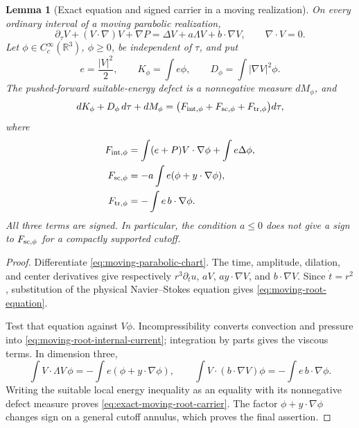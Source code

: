 \documentclass[11pt]{amsart}
\numberwithin{equation}{section}
\theoremstyle{plain}
\newtheorem{lemma}[lemma]{Lemma}
\theoremstyle{definition}
\theoremstyle{remark}
\begin{document}
\begin{lemma}[Exact equation and signed carrier in a moving realization]
\label{lem:exact-moving-root-carrier}
On every ordinary interval of a moving parabolic realization,
\begin{equation}\label{eq:moving-root-equation}
 \partial_\tau V+(V\cdot\nabla)V+\nabla P
 =\Delta V+a\Lambda V+b\cdot\nabla V,
 \qquad \nabla\cdot V=0.
\end{equation}
Let \(\phi\in C_c^\infty(\mathbb R^3)\), \(\phi\ge0\), be independent of
\(\tau\), and put
\[
 e=\frac{|V|^2}{2},\qquad K_\phi=\int e\phi,
 \qquad D_\phi=\int|\nabla V|^2\phi.
\]
The pushed-forward suitable-energy defect is a nonnegative measure
\(dM_\phi\), and
\begin{equation}\label{eq:exact-moving-root-carrier}
 dK_\phi+D_\phi\,d\tau+dM_\phi
 =\bigl(F_{\rm int,\phi}+F_{\rm sc,\phi}
        +F_{\rm tr,\phi}\bigr)d\tau,
\end{equation}
where
\begin{align}
 F_{\rm int,\phi}
  &=\int(e+P)V\cdot\nabla\phi+\int e\Delta\phi,
 \label{eq:moving-root-internal-current}\\
 F_{\rm sc,\phi}
  &=-a\int e(\phi+y\cdot\nabla\phi),
 \label{eq:moving-root-scale-current}\\
 F_{\rm tr,\phi}
  &=-\int e\,b\cdot\nabla\phi.
 \label{eq:moving-root-translation-current}
\end{align}
All three terms are signed.  In particular, the condition \(a\le0\) does not
give a sign to \(F_{\rm sc,\phi}\) for a compactly supported cutoff.
\end{lemma}

\begin{proof}
Differentiate \eqref{eq:moving-parabolic-chart}.  The time, amplitude,
dilation, and center derivatives give respectively
\(r^3\partial_tu\), \(aV\), \(ay\cdot\nabla V\), and
\(b\cdot\nabla V\).  Since \(\dot t=r^2\), substitution of the physical
Navier--Stokes equation gives \eqref{eq:moving-root-equation}.

Test that equation against \(V\phi\).  Incompressibility converts convection
and pressure into \eqref{eq:moving-root-internal-current}; integration by
parts gives the viscous terms.  In dimension three,
\[
 \int V\cdot\Lambda V\,\phi
 =-\int e(\phi+y\cdot\nabla\phi),
 \qquad
 \int V\cdot(b\cdot\nabla V)\phi
 =-\int e\,b\cdot\nabla\phi.
\]
Writing the suitable local energy inequality as an equality with its
nonnegative defect measure proves \eqref{eq:exact-moving-root-carrier}.
The factor \(\phi+y\cdot\nabla\phi\) changes sign on a general cutoff annulus,
which proves the final assertion.
\end{proof}
\end{document}
